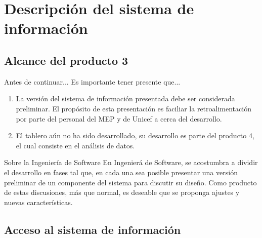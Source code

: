 \documentclass[xcolor=table, aspectratio=169]{beamer}
\begin{document}
\section{Descripci\'on del sistema de informaci\'on}

\subsection{Alcance del producto 3}

\begin{frame}[t]{Antes de continuar...}
    Es importante tener presente que...

	\begin{enumerate}
		\item La versi\'on del sistema de informaci\'on presentada debe ser considerada preliminar. El prop\'osito de esta presentaci\'on es faciliar la retroalimentaci\'on por parte del personal del MEP y de Unicef a cerca del desarrollo.
		\item El tablero a\'un no ha sido desarrollado, su desarrollo es parte del producto 4, el cual consiste en el an\'alisis de datos.
	\end{enumerate}
		
	\begin{block}{Sobre la Ingenier\'ia de Software}
		En Ingenier\'a de Software, se acostumbra a dividir el desarrollo en fases tal que, en cada una sea posible presentar una versi\'on preliminar de un componente del sistema para discutir su dise\~no. Como producto de estas discusiones, m\'as que normal, es deseable que se proponga ajustes y nuevas caracter\'isticas.
	\end{block}
\end{frame}

\subsection{Acceso al sistema de informaci\'on}
\end{document}
